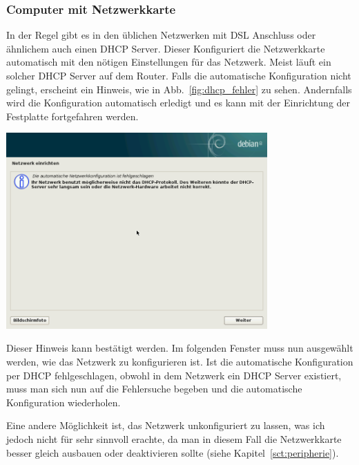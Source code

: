 \documentclass[a4paper,12pt,twoside]{article}
\begin{document}
\subsubsection{Computer mit Netzwerkkarte}
\label{sct:inst_mit_netzwerk}
In der Regel gibt es in den üblichen Netzwerken mit DSL Anschluss oder
ähnlichem auch einen DHCP Server. Dieser Konfiguriert die Netzwerkkarte
automatisch mit den nötigen Einstellungen für das Netzwerk. Meist läuft
ein solcher DHCP Server auf dem Router. Falls die automatische
Konfiguration nicht gelingt, erscheint ein Hinweis, wie in
Abb.~\ref{fig:dhcp_fehler} zu sehen. Andernfalls wird die Konfiguration
automatisch erledigt und es kann mit der Einrichtung der Festplatte
fortgefahren werden.

\begin{minipage}{\textwidth}
    \centering
    \captionsetup{type=figure}
    \includegraphics[width=10cm]{screenshots/message_dhcp_failed.png}
    \label{fig:dhcp_fehler}
\end{minipage}
\bigskip

Dieser Hinweis kann bestätigt werden. Im folgenden Fenster muss nun
ausgewählt werden, wie das Netzwerk zu konfigurieren ist. Ist die
automatische Konfiguration per DHCP fehlgeschlagen, obwohl in dem
Netzwerk ein DHCP Server existiert, muss man sich nun auf die
Fehlersuche begeben und die automatische Konfiguration wiederholen.

Eine andere Möglichkeit ist, das Netzwerk unkonfiguriert zu lassen, was
ich jedoch nicht für sehr sinnvoll erachte, da man in diesem Fall die
Netzwerkkarte besser gleich ausbauen oder deaktivieren sollte (siehe
Kapitel~\ref{sct:peripherie}).
\end{document}
